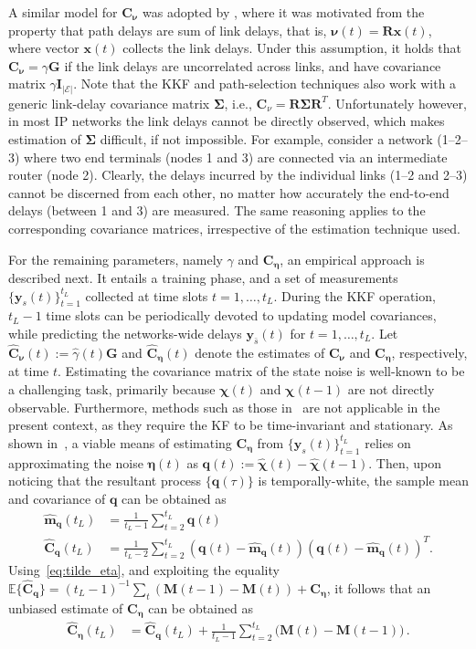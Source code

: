 \documentclass[draftcls,onecolumn,12pt]{IEEEtran}
\providecommand{\abs}[1]{\lvert#1\rvert}												\renewcommand{\b}[1]{\ensuremath{\mathbf{#1}}}		 							\newcommand{\bs}[1]{\ensuremath{\boldsymbol{#1}}}		 						\renewcommand{\c}[1]{\ensuremath{\mathcal{#1}}} 								\newcommand{\E}[1]{\ensuremath{\mathbb{E}\left[#1\right]}} 		  \newcommand{\Es}[1]{\ensuremath{\mathbb{E}^{*}\left[#1\right]}} \newcommand{\ind}{1\hspace{-1.6mm}1}														\newcommand{\norm}[1]{\ensuremath{\left\|#1\right\|}}						\newcommand{\tb}[1]{\ensuremath{\tilde{\mathbf{#1}}}}		 				\newcommand{\mat}[1]{\ensuremath{\begin{bmatrix}#1\end{bmatrix}}}
\def \yst {{\b{y}_s(t)}}
\def \ybt {{\b{y}_{\bar{s}}(t)}}
\def \chih {{\hat{\bs{\chi}}}}
\def \bnu {{\bs{\nu}}}
\def \nut {{\bs{\nu}(t)}}
\def \xt {{\b{x}(t)}}
\def \Exp {\mathbb{E}}
\def \ceta {{\b{C}_{\bs{\eta}}}}
\def \cnu {{\b{C}_{\bs{\nu}}}}
\theoremstyle{plain}\newtheorem{thm}{Theorem}
\theoremstyle{definition}
\theoremstyle{remark}
\begin{document}
A similar model for $\cnu$ was adopted by \cite{nk}, where it was motivated from the property that path delays are sum of link delays, that is, $\nut = \b{R}\xt$, where vector $\xt$ collects the link delays.
Under this assumption, it holds that $\cnu=\gamma\b{G}$ if the link delays are uncorrelated across links, and have covariance matrix $\gamma\b{I}_{\abs{\c{E}}}$. 
{ Note that the KKF and path-selection techniques also work with a generic link-delay covariance matrix $\bs{\Sigma}$, i.e., $\mathbf{C}_\nu = \mathbf{R} \mathbf{\Sigma}\mathbf{R}^T$. 
Unfortunately however, in most IP networks the link delays cannot be directly observed, which makes estimation of $\mathbf{\Sigma}$ difficult, if not impossible.
For example, consider a network (1--2--3) where two end terminals (nodes 1 and 3) are connected via an intermediate router (node 2). Clearly, the delays incurred by the individual links (1--2 and 2--3) cannot be discerned from each other, no matter how accurately the end-to-end delays (between 1 and 3) are measured. 
The same reasoning applies to the corresponding covariance matrices, irrespective of the estimation technique used. }

 
For the remaining parameters, namely $\gamma$ and $\ceta$, an empirical approach is described next. 
It entails a training phase, and a set of measurements $\{\yst\}_{t = 1}^{t_L}$ collected at time slots $t = 1,\ldots, t_L$. 
During the KKF operation, $t_L - 1$ time slots can be periodically devoted to updating model covariances, while predicting the networks-wide delays $\ybt$ for $t = 1,\ldots, t_L$. 
Let $\widehat{\b{C}}_{\bnu}(t):=\hat{\gamma}(t)\b{G}$ and $\widehat{\b{C}}_{\bs{\eta}}(t)$ denote the estimates of $\cnu$ and $\ceta$, respectively, at time $t$.
Estimating the covariance matrix of the state noise is well-known to be a challenging task, primarily because $\bs{\chi}(t)$ and $\bs{\chi}(t-1)$ are not directly observable. 
Furthermore, methods such as those in~\cite{Mehra70} are not applicable in the present context, as they require the KF to be time-invariant and stationary. 
As shown in~\cite{Myers76}, a viable means of estimating $\ceta$ from $\{\yst\}_{t = 1}^{t_L}$ relies on approximating the noise $\bs{\eta}(t)$ as $\bs{q}(t) := \chih(t) - \chih(t-1)$. 
Then, upon  noticing that the resultant process $\{\bs{q}(\tau)\}$ is temporally-white, the sample mean and covariance of $\bs{q}$ can be obtained as \begin{align}
\hat{\bs{m}}_{\bs{q}}(t_L) &= \frac{1}{t_L-1} \sum_{t = 2}^{t_L} \bs{q}(t) \\
\widehat{\b{C}}_{\bs{q}}(t_L) &= \frac{1}{t_L- 2} \sum_{t = 2}^{t_L}(\bs{q}(t) - \hat{\bs{m}}_{\bs{q}}(t))(\bs{q}(t)-\hat{\bs{m}}_{\bs{q}}(t))^T.
\label{eq:tilde_eta}  
\end{align}
Using~\eqref{eq:tilde_eta}, and exploiting the equality $\Exp\{\widehat{\b{C}}_{\bs{q}}\} = (t_L-1)^{-1} \sum_{t} ( \b{M}(t-1)   - \b{M}(t)) + \ceta$, it follows that an unbiased estimate of $\b{C}_{\b{\eta}}$ can be obtained as 
\begin{align}
\widehat{\b{C}}_{\b{\eta}}(t_L)  & = \widehat{\b{C}}_{\bs{q}}(t_L) + \frac{1}{t_L - 1} \sum_{t = 2}^{t_L} \Big( \b{M}(t) -  \b{M}(t -1) \Big)  \, .
\end{align}
\end{document}
